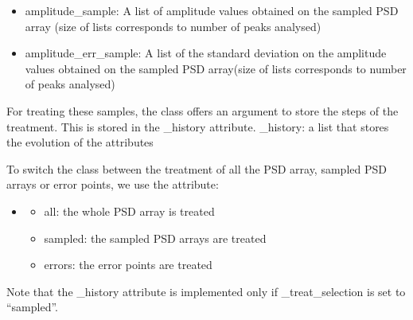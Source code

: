 \documentclass[letterpaper,10pt,english]{sphinxmanual}
\begin{document}
\begin{fulllineitems}
\begin{itemize}
\item {} 
\sphinxAtStartPar
amplitude\_sample: A list of amplitude values obtained on the sampled PSD array  (size of lists corresponds to number of peaks analysed)

\item {} 
\sphinxAtStartPar
amplitude\_err\_sample: A list of the standard deviation on the amplitude values obtained on the sampled PSD array(size of lists corresponds to number of peaks analysed)

\end{itemize}

\sphinxAtStartPar
For treating these samples, the class offers an argument to store the steps of the treatment. This is stored in the \_history attribute.
\sphinxhyphen{} \_history: a list that stores the evolution of the attributes

\sphinxAtStartPar
To switch the class between the treatment of all the PSD array, sampled PSD arrays or error points, we use the attribute:
\begin{itemize}
\item {} \begin{description}
\begin{itemize}
\item {} 
\sphinxAtStartPar
all: the whole PSD array is treated

\item {} 
\sphinxAtStartPar
sampled: the sampled PSD arrays are treated

\item {} 
\sphinxAtStartPar
errors: the error points are treated

\end{itemize}

\end{description}

\end{itemize}

\sphinxAtStartPar
Note that the \_history attribute is implemented only if \_treat\_selection is set to “sampled”.


\end{fulllineitems}
\end{document}
